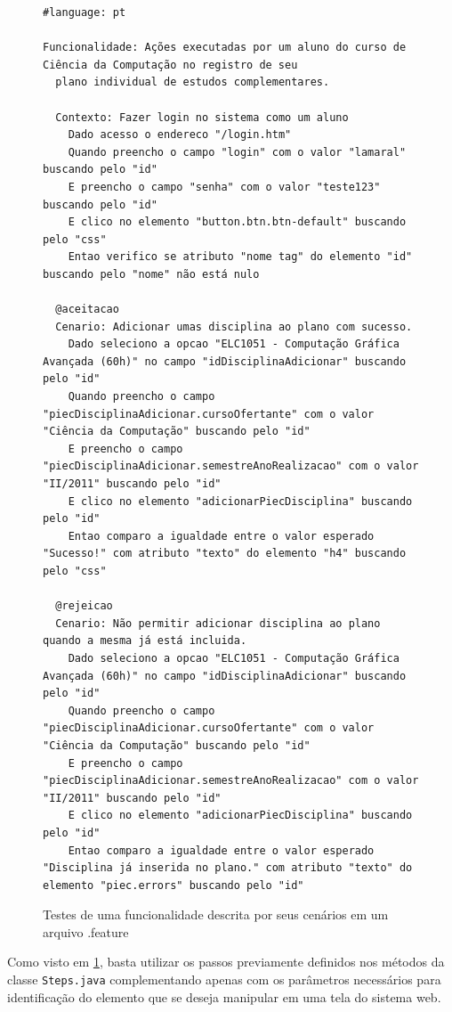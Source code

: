 \documentclass[tg]{mdtufsm}
\begin{document}
\begin{figure}[!htt]
	\begin{lstlisting}
#language: pt

Funcionalidade: Ações executadas por um aluno do curso de Ciência da Computação no registro de seu
  plano individual de estudos complementares.

  Contexto: Fazer login no sistema como um aluno
    Dado acesso o endereco "/login.htm"
    Quando preencho o campo "login" com o valor "lamaral" buscando pelo "id"
    E preencho o campo "senha" com o valor "teste123" buscando pelo "id"
    E clico no elemento "button.btn.btn-default" buscando pelo "css"
    Entao verifico se atributo "nome tag" do elemento "id" buscando pelo "nome" não está nulo

  @aceitacao
  Cenario: Adicionar umas disciplina ao plano com sucesso.
    Dado seleciono a opcao "ELC1051 - Computação Gráfica Avançada (60h)" no campo "idDisciplinaAdicionar" buscando pelo "id"
    Quando preencho o campo "piecDisciplinaAdicionar.cursoOfertante" com o valor "Ciência da Computação" buscando pelo "id"
    E preencho o campo "piecDisciplinaAdicionar.semestreAnoRealizacao" com o valor "II/2011" buscando pelo "id"
    E clico no elemento "adicionarPiecDisciplina" buscando pelo "id"
    Entao comparo a igualdade entre o valor esperado "Sucesso!" com atributo "texto" do elemento "h4" buscando pelo "css"

  @rejeicao
  Cenario: Não permitir adicionar disciplina ao plano quando a mesma já está incluida.
    Dado seleciono a opcao "ELC1051 - Computação Gráfica Avançada (60h)" no campo "idDisciplinaAdicionar" buscando pelo "id"
    Quando preencho o campo "piecDisciplinaAdicionar.cursoOfertante" com o valor "Ciência da Computação" buscando pelo "id"
    E preencho o campo "piecDisciplinaAdicionar.semestreAnoRealizacao" com o valor "II/2011" buscando pelo "id"
    E clico no elemento "adicionarPiecDisciplina" buscando pelo "id"
    Entao comparo a igualdade entre o valor esperado "Disciplina já inserida no plano." com atributo "texto" do elemento "piec.errors" buscando pelo "id"
	\end{lstlisting}
	\caption{Testes de uma funcionalidade descrita por seus cenários em um arquivo .feature}
	\label{code:feature}
\end{figure}

Como visto em \ref{code:feature}, basta utilizar os passos previamente definidos nos métodos da classe \texttt{Steps.java} complementando apenas com os parâmetros necessários para identificação do elemento que se deseja manipular em uma tela do sistema web.
\end{document}
